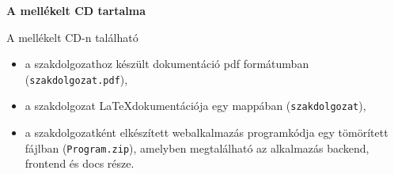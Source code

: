\label{Chap:CD}
\pagestyle{empty}

\noindent \textbf{\Large A mellékelt CD tartalma}

\vskip 1cm

A mellékelt CD-n található

\begin{itemize}
\item a szakdolgozathoz készült dokumentáció pdf formátumban (\texttt{szakdolgozat.pdf}), 
\item a szakdolgozat \LaTeX dokumentációja egy mappában (\texttt{szakdolgozat}),
\item a szakdolgozatként elkészített webalkalmazás programkódja egy tömörített fájlban (\texttt{Program.zip}), amelyben megtalálható az alkalmazás backend, frontend és docs része.
\end{itemize}